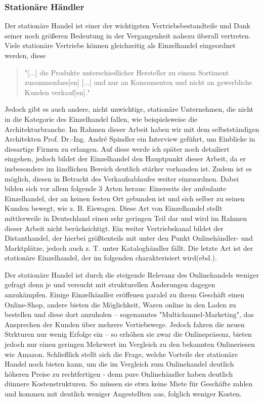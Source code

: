 \begin{folding} \subsubsection{Stationäre Händler}
Der stationäre Handel ist einer der wichtigsten Vertriebsbestandteile und Dank seiner noch größeren Bedeutung in der Vergangenheit nahezu überall vertreten. Viele stationäre Vertriebe können gleichzeitig als Einzelhandel eingeordnet werden, diese
\begin{quote}
    "[...] die Produkte unterschiedlicher Hersteller zu einem Sortiment zusammenfass[en] [...] und nur an Konsumenten und nicht an gewerbliche Kunden verkauf[en]."\cite[S. 20]{Ebert}
\end{quote}
Jedoch gibt es auch andere, nicht unwichtige, stationäre Unternehmen, die nicht in die Kategorie des Einzelhandel fallen, wie beispielsweise die Architekturbranche. Im Rahmen dieser Arbeit haben wir mit dem selbstständigen Architekten Prof. Dr.-Ing. André Spindler ein Interview geführt, um Einblicke in diesartige Firmen zu erlangen. Auf diese werde ich später noch detailiert eingehen, jedoch bildet der Einzelhandel den Hauptpunkt dieser Arbeit, da er insbesondere im ländlichen Bereich deutlich stärker vorhanden ist. Zudem ist es möglich, diesen in Betracht des Verkaufsablaufes weiter einzuordnen. Dabei bilden sich vor allem folgende 3 Arten heraus: Einerseits der ambulante Einzelhandel, der an keinen festen Ort gebunden ist und sich selber zu seinen Kunden bewegt, wie z. B. Eiswagen. Diese Art von Einzelhandel stellt mittlerweile in Deutschland einen sehr geringen Teil dar und wird im Rahmen dieser Arbeit nicht berücksichtigt. Ein weiter Vertriebskanal bildet der Distanthandel, der hierbei größtenteils mit unter den Punkt Onlinehändler- und Marktplätze, jedoch auch z. T. unter Kataloghändler fällt. Die letzte Art ist der stationäre Einzelhandel, der im folgenden charakterisiert wird(ebd.).

Der stationäre Handel ist durch die steigende Relevanz des Onlinehandels weniger gefragt denn je und versucht mit strukturellen Änderungen dagegen anzukämpfen. Einige Einzelhändler eröffenen paralel zu ihrem Geschäft einen Online-Shop, andere bieten die Möglichkeit, Waren online in den Laden zu bestellen und diese dort anzuholen – sogenanntes "Multichannel-Marketing", das Ansprechen der Kunden über mehrere Vertiebswege\cite[S. 34f]{Graf}. Jedoch fahren die neuen Strkturen nur wenig Erfolge ein – so erhöhen sie zwar die Onlinepräsenz, bieten jedoch nur einen geringen Mehrwert im Vergleich zu den bekannten Onlineriesen wie Amazon\cite[S. 34f]{Graf}. 
Schließlich stellt sich die Frage, welche Vorteile der stationäre Handel noch bieten kann, um die im Vergleich zum Onlinehandel deutlich höheren Preise zu rechtfertigen - denn pure Onlinehändler haben deutlich dünnere Kostenstrukturen\cite[S. 14]{evilcom}. So müssen sie etwa keine Miete für Geschäfte zahlen und kommen mit deutlich weniger Angestellten aus, folglich weniger Kosten.


\end{folding}
